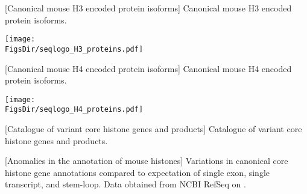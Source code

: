   \newpage
  \begin{center}
  [Canonical mouse H3 encoded protein isoforms]%
                   {Canonical mouse H3 encoded protein isoforms.}
  
  \texttt{[image: \\FigsDir/seqlogo\_H3\_proteins.pdf]}
  \end{center}

  \newpage
  \begin{center}
  [Canonical mouse H4 encoded protein isoforms]%
                   {Canonical mouse H4 encoded protein isoforms.}
  
  \texttt{[image: \\FigsDir/seqlogo\_H4\_proteins.pdf]}
  \end{center}

  \newpage
  \begin{center}
  [Catalogue of variant core histone genes and products]%
                   {Catalogue of variant core histone genes and products.}
  
  \end{center}

  \newpage
  \begin{center}
    [Anomalies in the annotation of mouse histones]{
        Variations in canonical core histone gene annotations
        compared to expectation of single exon, single transcript,
        and stem-loop.
        Data obtained from NCBI RefSeq \citep{OLearyRefseq2016} on
        \SequencesDate{}.
    }
  \begin{itemize}
  
  \end{itemize}
  \end{center}
